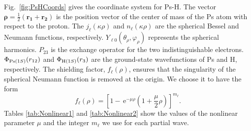 \documentclass[preprint,showpacs,showkeys,preprintnumbers,amsmath,amssymb,longbibliography,pra,aps]{revtex4-1}
\newcommand{\ee} {\,\text{e}}
\begin{document}
Fig.~\ref{fig:PsHCoords} gives the
coordinate system for Ps-H. The vector
$\bm{\rho} = \frac{1}{2}\left(\bm{r_1} + \bm{r_2}\right)$ is the position
vector of the center of mass of the Ps atom with respect to the proton.
The $j_\ell\left(\kappa\rho\right)$ and $n_\ell\left(\kappa\rho\right)$ are
the spherical Bessel and Neumann functions, respectively.
$Y_{\ell 0}(\theta_\rho, \varphi_\rho)$ represents the spherical harmonics.
$P_{23}$ is the exchange operator for the two indistinguishable electrons.
$\Phi_{{\rm{Ps}}(1S)}\!\left(r_{12}\right)$ and
$\Phi_{{\rm{H}}(1S)}\!\left(r_3\right)$ are the ground-state wavefunctions
of Ps and H, respectively. The shielding factor, $f_\ell(\rho)$,
ensures that the singularity of the spherical Neumann function is removed
at the origin. We choose it to have the form
\begin{equation}
f_\ell(\rho) = \left[1 - \ee^{-\mu \rho} \left(1+\frac{\mu}{2}\rho\right)
\right]^{m_\ell}.
\label{eq:PartialWaveShielding}
\end{equation}
Tables \ref{tab:Nonlinear1} and \ref{tab:Nonlinear2} show the values of the
nonlinear parameter $\mu$ and the integer $m_\ell$ we use for each partial
wave.
\end{document}
